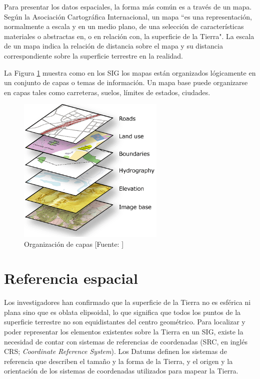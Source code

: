Para presentar los datos espaciales, la forma más común es a través de un mapa. Según la Asociación Cartográfica Internacional, un mapa ``es una representación, normalmente a escala y en un medio plano, de una selección de características materiales o abstractas en, o en relación con, la superficie de la Tierra". La escala de un mapa indica la relación de distancia sobre el mapa y su distancia correspondiente sobre la superficie terrestre en la realidad.

La Figura \ref{fig:capasGis} muestra como en los SIG los mapas están organizados lógicamente en un conjunto de capas o temas de información. Un mapa base puede organizarse en capas tales como carreteras, suelos, límites de estados, ciudades.

\begin{figure}[H]
    \centering
    \includegraphics[width=7cm]{capas_gis.png}
    \caption{Organización de capas [Fuente: ]}
    \label{fig:capasGis}
\end{figure}

\section{Referencia espacial}

Los investigadores han confirmado que la superficie de la Tierra no es esférica ni plana sino que es oblata elipsoidal, lo que significa que todos los puntos de la superficie terrestre no son equidistantes del centro geométrico. Para localizar y poder representar los elementos existentes sobre la Tierra en un SIG, existe la necesidad de contar con sistemas de referencias de coordenadas (SRC, en inglés CRS; \textit{Coordinate Reference System}). Los Datums definen los sistemas de referencia que describen el tamaño y la forma de la Tierra, y el origen y la orientación de los sistemas de coordenadas utilizados para mapear la Tierra.

